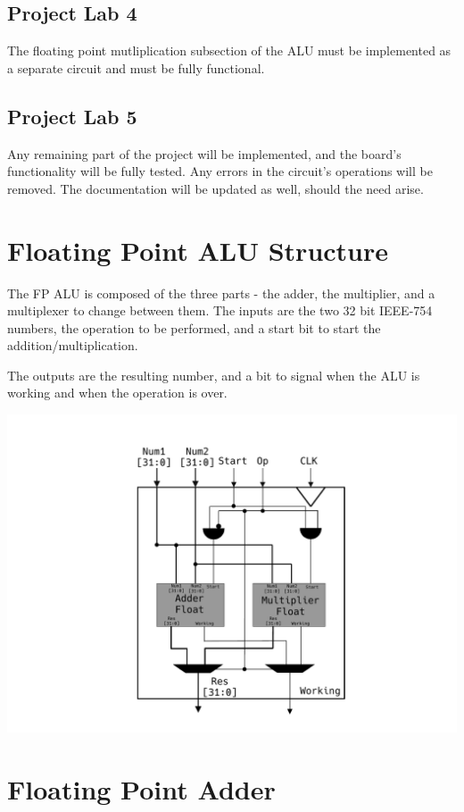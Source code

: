 \documentclass[a4paper,10pt]{article}
\begin{document}
    \subsection{Project Lab 4}
    The floating point mutliplication subsection of the ALU must be implemented as a separate circuit and must be fully functional.

    \subsection{Project Lab 5}
    Any remaining part of the project will be implemented, and the board's functionality will be fully tested. Any errors in the circuit's operations will be removed. The documentation will be updated as well, should the need arise.

    \newpage
    \section{Floating Point ALU Structure}
    The FP ALU is composed of the three parts - the adder, the multiplier, and a multiplexer to change between them. The inputs are the two 32 bit IEEE-754 numbers, the operation to be performed, and a start bit to start the addition/multiplication.

    The outputs are the resulting number, and a bit to signal when the ALU is working and when the operation is over.


    \centerline{\includegraphics[scale=0.75]{ALUBig.pdf}}

    \newpage
    \section{Floating Point Adder}
\end{document}
